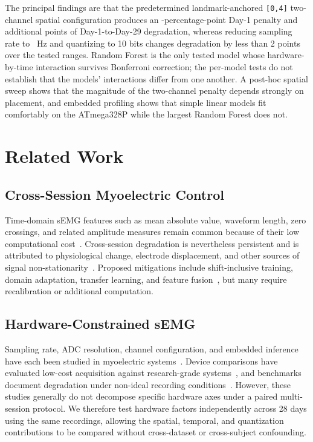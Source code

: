 \documentclass[preprint,12pt]{elsarticle}
\begin{document}
The principal findings are that the predetermined landmark-anchored \texttt{[0,4]} two-channel spatial configuration produces an \spatialDayOnePenalty{}-percentage-point Day-1 penalty and \spatialDropPenalty{} additional points of Day-1-to-Day-29 degradation, whereas reducing sampling rate to \fsCommodity{}~Hz and quantizing to 10 bits changes degradation by less than 2 points over the tested ranges. Random Forest is the only tested model whose hardware-by-time interaction survives Bonferroni correction; the per-model tests do not establish that the models' interactions differ from one another. A post-hoc spatial sweep shows that the magnitude of the two-channel penalty depends strongly on placement, and embedded profiling shows that simple linear models fit comfortably on the ATmega328P while the largest Random Forest does not.

\section{Related Work}

\subsection{Cross-Session Myoelectric Control}
Time-domain sEMG features such as mean absolute value, waveform length, zero crossings, and related amplitude measures remain common because of their low computational cost~\cite{204774,PHINYOMARK20127420}. Cross-session degradation is nevertheless persistent and is attributed to physiological change, electrode displacement, and other sources of signal non-stationarity~\cite{10.3389/fnbot.2018.00058,8009405}. Proposed mitigations include shift-inclusive training, domain adaptation, transfer learning, and feature fusion~\cite{HARGROVE2008175,doi:10.1142/S0219843620500255,8673876,9207910}, but many require recalibration or additional computation.

\subsection{Hardware-Constrained sEMG}
Sampling rate, ADC resolution, channel configuration, and embedded inference have each been studied in myoelectric systems~\cite{5626224,verdini2026sampling,tavakoli2018doublechannel,7974234,moin2021wearable}. Device comparisons have evaluated low-cost acquisition against research-grade systems~\cite{Pizzolato2017-zd}, and benchmarks document degradation under non-ideal recording conditions~\cite{9771219}. However, these studies generally do not decompose specific hardware axes under a paired multi-session protocol. We therefore test hardware factors independently across 28 days using the same recordings, allowing the spatial, temporal, and quantization contributions to be compared without cross-dataset or cross-subject confounding.
\end{document}
